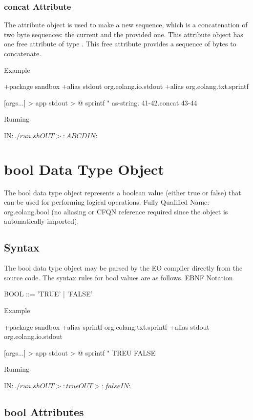 \documentclass[12pt]{book}
\begin{document}
\subsubsection{concat Attribute}
The  attribute object is used to make a new sequence, which is a concatenation of two byte sequences: the current and the provided one. This attribute object has one free attribute of type . This free attribute provides a sequence of bytes to concatenate.

Example
\begin{ffcode}
+package sandbox
+alias stdout org.eolang.io.stdout
+alias org.eolang.txt.sprintf

[args...] > app
  stdout > @
    sprintf
      "%
      as-string.
        41-42.concat 43-44


Running

IN$: ./run.sh
OUT>: ABCD
IN$: 
\end{ffcode}

\section{bool Data Type Object}
The bool data type object represents a boolean value (either true or false) that can be used for performing logical operations.
Fully Qualified Name: org.eolang.bool (no aliasing or CFQN reference required since the object is automatically imported).

\subsection{Syntax}
The bool data type object may be parsed by the EO compiler directly from the source code. The syntax rules for bool values are as follows.
EBNF Notation

\begin{ffcode}
BOOL     ::= 'TRUE'
           | 'FALSE'
\end{ffcode}

Example
\begin{ffcode}
+package sandbox
+alias sprintf org.eolang.txt.sprintf
+alias stdout org.eolang.io.stdout

[args...] > app
  stdout > @
    sprintf
      "%
      TREU
      FALSE

Running

IN$: ./run.sh
OUT>: true
OUT>: false
IN$: 
\end{ffcode}

\subsection{bool Attributes}
\end{document}
